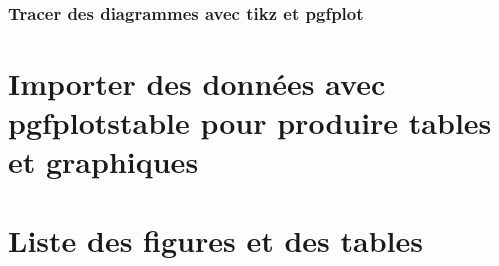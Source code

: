 \documentclass[12pt]{article}
\begin{document}
\begin{tikzpicture}
\end{tikzpicture}


\subsubsection{Tracer des diagrammes avec tikz  et pgfplot}



\section{Importer des données avec pgfplotstable pour produire tables et graphiques}






\begin{tikzpicture}
\end{tikzpicture}


\begin{tikzpicture}[xscale=1.5]
\end{tikzpicture}






\section{Liste des figures et des tables}
\end{document}
